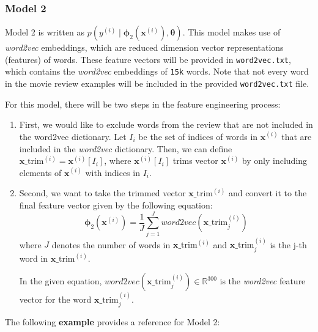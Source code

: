 \documentclass[11pt,addpoints,answers]{exam}
\newcommand{\xv}{\mathbf{x}}
\newcommand{\thetav     }{\boldsymbol \theta     }
\begin{document}
\subsubsection{Model 2}

Model 2 is written as $p\left(y^{(i)} \mid \boldsymbol{\phi}_2\left(\xv^{(i)}\right), \thetav\right)$. This model makes use of \emph{word2vec} embeddings, which are reduced dimension  vector representations (features) of words. These feature vectors will be provided in \texttt{word2vec.txt}, which contains the \emph{word2vec} embeddings of \texttt{15k} words. Note that not every word in the movie review examples will be included in the provided \texttt{word2vec.txt} file.
    
For this model, there will be two steps in the feature engineering process: 
    
\begin{enumerate}
    \item First, we would like to exclude words from the review that are not included in the word2vec dictionary. Let ${I_i}$ be the set of indices of words in $\xv^{(i)}$ that are included in the \emph{word2vec} dictionary. Then, we can define $\xv\_\text{trim}^{(i)} = \xv^{(i)}[I_i]$, where $\xv^{(i)}[I_i]$ trims vector $\xv^{(i)}$ by only including elements of $\xv^{(i)}$ with indices in $I_i$. 
    \item Second, we want to take the trimmed vector $\xv\_\text{trim}^{(i)}$ and convert it to the final feature vector given by the following equation:
    $$\boldsymbol{\phi}_2\left(\xv^{(i)}\right) = \frac{1}{J} \sum_{j=1}^J word2vec(\xv\_\text{trim}^{(i)}_j) $$
    where $J$ denotes the number of words in $\xv\_\text{trim}^{(i)}$ and $\xv\_\text{trim}^{(i)}_j$ is the j-th word in $\xv\_\text{trim}^{(i)}$.
    
     In the given equation, $word2vec(\xv\_\text{trim}^{(i)}_j) \in \mathbb{R}^{300}$ is the \emph{word2vec} feature vector for the word $\xv\_\text{trim}^{(i)}_j$.
\end{enumerate}
    
The following \textbf{example} provides a reference for Model 2:
\end{document}
